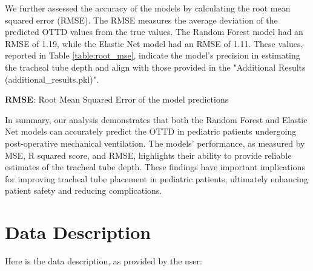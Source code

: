 \documentclass[11pt]{article}
\begin{document}
We further assessed the accuracy of the models by calculating the root mean squared error (RMSE). The RMSE measures the average deviation of the predicted OTTD values from the true values. The Random Forest model had an RMSE of 1.19, while the Elastic Net model had an RMSE of 1.11. These values, reported in Table {}\ref{table:root_mse}, indicate the model's precision in estimating the tracheal tube depth and align with those provided in the "Additional Results (additional\_results.pkl)".

\begin{table}[h]
\caption{Root Mean Squared Error for Random Forest and Elastic Net models in predicting OTTD.}
\label{table:root_mse}
\begin{threeparttable}
\renewcommand{\TPTminimum}{\linewidth}
\begin{tablenotes}
\footnotesize
\item \textbf{RMSE}: Root Mean Squared Error of the model predictions
\end{tablenotes}
\end{threeparttable}
\end{table}


In summary, our analysis demonstrates that both the Random Forest and Elastic Net models can accurately predict the OTTD in pediatric patients undergoing post-operative mechanical ventilation. The models' performance, as measured by MSE, R squared score, and RMSE, highlights their ability to provide reliable estimates of the tracheal tube depth. These findings have important implications for improving tracheal tube placement in pediatric patients, ultimately enhancing patient safety and reducing complications.


\clearpage
\appendix

\section{Data Description} \label{sec:data_description} Here is the data description, as provided by the user:
\end{document}

